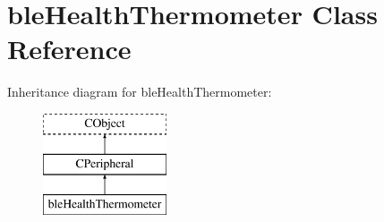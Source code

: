 \hypertarget{classble_health_thermometer}{\section{ble\-Health\-Thermometer Class Reference}
\label{classble_health_thermometer}
}
Inheritance diagram for ble\-Health\-Thermometer\-:\begin{figure}[H]
\begin{center}
\leavevmode
\includegraphics[height=3.000000cm]{classble_health_thermometer}
\end{center}
\end{figure}
